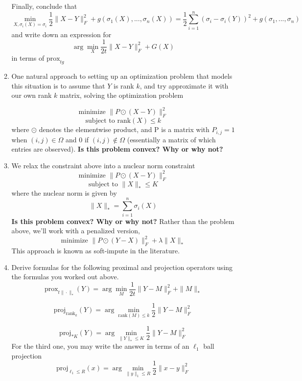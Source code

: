 \documentclass[11pt]{amsart}
\begin{document}
\begin{enumerate}
\begin{enumerate}
Finally, conclude that 
\[
\min_{X,\sigma_{i}\left(X\right)=\sigma_{i}}\frac{1}{2}\|X-Y\|_{F}^{2}+g\left(\sigma_{1}\left(X\right),...,\sigma_{n}(X)\right)=\frac{1}{2}\sum_{i=1}^{n}\left(\sigma_{i}-\sigma_{i}(Y)\right)^{2}+g\left(\sigma_{1},...,\sigma_{n}\right)
\]
and write down an expression for 
\[
\arg\min_{X}\frac{1}{2t}\|X-Y\|_{F}^{2}+G(X)
\]
in terms of $\textrm{prox}_{tg}$


\item One natural approach to setting up an optimization problem that models this situation is to assume that $Y$ is rank $k$, and try approximate it with our own rank $k$ matrix, solving the optimization problem 

\begin{equation}
\textrm{minimize  } \| P\odot(X-Y)\|_F^2
\end{equation}
\[
\textrm{subject to  } \textrm{rank}(X)\leq k
\]
where $\odot$ denotes the elementwise product, and P is a matrix with $P_{i,j}=1$ when $(i,j)\in\Omega$ and 0 if $(i,j)\not\in\Omega$ (essentially a matrix of which entries are observed). \textbf{Is this problem convex? Why or why not?}

\item We relax the constraint above into a nuclear norm constraint
\[
\textrm{minimize  } \| P\odot(X-Y)\|_F^2
\]
\[
\textrm{subject to  } \|X\|_*\leq K
\]
where the nuclear norm is given by
\[
\|X\|_* = \sum_{i=1}^n \sigma_i(X)
\]
\textbf{Is this problem convex? Why or why not?} Rather than the problem above, we'll work with a penalized version,
\begin{equation}
\textrm{minimize  } \| P\odot(Y-X)\|_F^2 + \lambda \|X\|_*
\end{equation}
This approach is known as soft-impute in the literature.


\item Derive formulas for the following proximal and projection operators using the formulas you worked out above.
\[
\textrm{prox}_{t\|\cdot\|_*}(Y)=\arg \min_M \frac{1}{2t}\|Y-M\|_F^2 + \|M\|_*
\]

\[
\textrm{proj}_{\textrm{rank}_k}(Y)=\arg \min_{\textrm{rank}(M)\leq k} \frac{1}{2}\|Y-M\|_F^2
\]

\[
\textrm{proj}_{*K}(Y)=\arg \min_{\|Y\|_*\leq K} \frac{1}{2}\|Y-M\|_F^2
\]
For the third one, you may write the answer in terms of an $\ell_1$ ball projection
\[
\textrm{proj}_{\ell_1\leq R}(x)=\arg\min_{\|y\|_1\leq R} \frac{1}{2}\|x-y\|_F^2
\]



\end{enumerate}
\end{enumerate}
\end{document}

